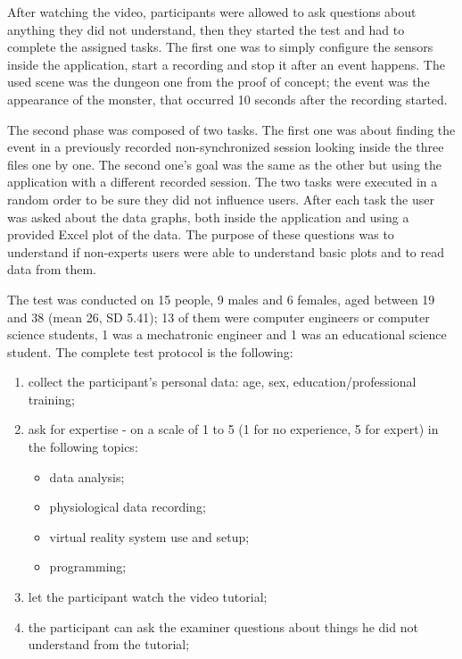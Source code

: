 \documentclass[binding=0.6cm,LaM]{sapthesis}
\begin{document}
After watching the video, participants were allowed to ask questions about anything they did not understand, then they started the test and had to complete the assigned tasks. The first one was to simply configure the sensors inside the application, start a recording and stop it after an event happens. The used scene was the dungeon one from the proof of concept; the event was the appearance of the monster, that occurred 10 seconds after the recording started. 

The second phase was composed of two tasks. The first one was about finding the event in a previously recorded non-synchronized session looking inside the three files one by one. The second one's goal was the same as the other but using the application with a different recorded session. The two tasks were executed in a random order to be sure they did not influence users. After each task the user was asked about the data graphs, both inside the application and using a provided Excel plot of the data. The purpose of these questions was to understand if non-experts users were able to understand basic plots and to read data from them.

The test was conducted on 15 people, 9 males and 6 females, aged between 19 and 38 (mean 26, SD 5.41); 13 of them were computer engineers or computer science students, 1 was a mechatronic engineer and 1 was an educational science student. The complete test protocol is the following:

\begin{enumerate}

\item collect the participant's personal data: age, sex, education/professional training;

\item ask for expertise - on a scale of 1 to 5 (1 for no experience, 5 for expert) in the following topics:
\begin{itemize}
\item data analysis;
\item physiological data recording;
\item virtual reality system use and setup;
\item programming;
\end{itemize}

\item let the participant watch the video tutorial;

\item the participant can ask the examiner questions about things he did not understand from the tutorial;

\end{enumerate}
\end{document}
